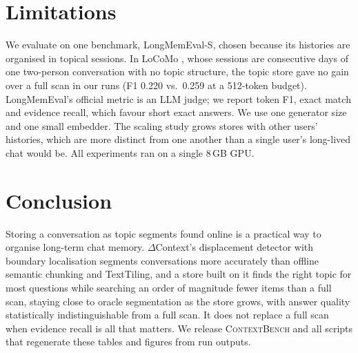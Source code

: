 \documentclass[11pt]{article}
\newcommand{\dc}{$\Delta$Context}
\begin{document}
\section{Limitations}

We evaluate on one benchmark, LongMemEval-S, chosen because its histories are
organised in topical sessions. In LoCoMo \citep{maharana2024locomo}, whose
sessions are consecutive days of one two-person conversation with no topic
structure, the topic store gave no gain over a full scan in our runs (F1 0.220
vs.\ 0.259 at a 512-token budget). LongMemEval's official metric is an LLM
judge; we report token F1, exact match and evidence recall, which favour short
exact answers. We use one generator size and one small embedder. The scaling
study grows stores with other users' histories, which are more distinct from
one another than a single user's long-lived chat would be. All experiments ran
on a single 8\,GB GPU.

\section{Conclusion}

Storing a conversation as topic segments found online is a practical way to
organise long-term chat memory. \dc{}'s displacement detector with boundary
localisation segments conversations more accurately than offline semantic
chunking and TextTiling, and a store built on it finds the right topic for most
questions while searching an order of magnitude fewer items than a full scan,
staying close to oracle segmentation as the store grows, with answer quality
statistically indistinguishable from a full scan. It does not replace a full
scan when evidence recall is all that matters. We release \textsc{ContextBench} and
all scripts that regenerate these tables and figures from run outputs.



\end{document}
